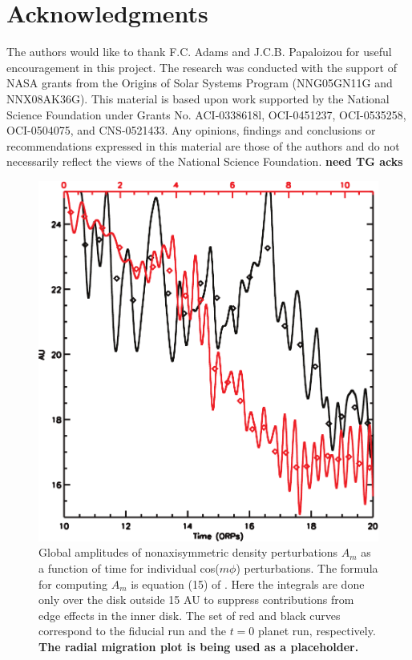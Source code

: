 \documentclass[12pt,manuscript,authoryear]{aastex}
\begin{document}
\section{Acknowledgments}

The authors would like to thank F.C. Adams and J.C.B. Papaloizou for useful encouragement in this project. The research was conducted with the support of NASA grants from the Origins of Solar Systems  Program (NNG05GN11G and NNX08AK36G). This material is based upon work supported by the National Science Foundation under Grants No. ACI-0338618l, OCI-0451237, OCI-0535258, OCI-0504075, and CNS-0521433. Any opinions, findings and conclusions or recommendations expressed in this material are those of the authors and do not necessarily reflect the views of the National Science Foundation. {\bf need TG acks}




\newpage

\begin{figure}[t]
\center
\includegraphics[width=12cm]{../Figures/planeta.pdf}
\caption{Global amplitudes of nonaxisymmetric density perturbations $A_m$ as a function of time for individual cos($m\phi$) perturbations. The formula for computing $A_m$ is equation (15) of \citep{boley2006}. Here the integrals are done only over the disk outside 15 AU to suppress contributions from edge effects in the inner disk. The set of red and black curves correspond to the fiducial run and the $t = 0$ planet run, respectively. {\bf The radial migration plot is being used as a placeholder.}}
\label{fig:Am}
\end{figure}
\end{document}
